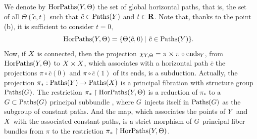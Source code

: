 \begin{article}
   We denote by $\operatorname{HorPaths}(Y,\Theta)$ the set of global horizontal paths,
  that is,
  the set of all $\Theta(\tilde c,t)$ such that $\tilde c \in \operatorname{Paths}(Y)$ and $t \in {\mathbf R}$.
  Note that, thanks to the point (b),
  it is sufficient to consider $t=0$,
  $$%
  \HorPaths(\Y,\Theta) = \{ \Theta(\tilde c,0) \mid \tilde c \in \Paths(\Y) \}.
  $$%
  Now,
  if $X$ is connected,
  then the projection $\chi_{Y,\Theta} = \pi \times \pi \circ \operatorname{ends}_Y$,
  from $\operatorname{HorPaths}(Y,\Theta)$ to $X \times X$,
  which associates with a horizontal path $\bar c$ the projections  $\pi \circ \bar c (0)$ and $\pi \circ \bar c (1)$ of its ends,
  is a subduction.
  Actually,
  the projection $\pi_*: \operatorname{Paths}(Y) \to \operatorname{Paths}(X)$ is a principal fibration with structure group $\operatorname{Paths}(G)$.
  The restriction $\pi_* \restriction \operatorname{HorPaths}(Y, \Theta)$ is a reduction of $\pi_*$ to a $G \subset \operatorname{Paths}(G)$ principal subbundle ,
  where $G$ injects itself in $\operatorname{Paths}(G)$ as the subgroup of constant paths.
  And the map, which associates the points of $Y$ and $X$ with the associated constant paths,
  is a strict  morphism of $G$-principal fiber bundles from $\pi$ to the restriction $\pi_* \restriction \operatorname{HorPaths}(Y, \Theta)$.
\end{article} %

